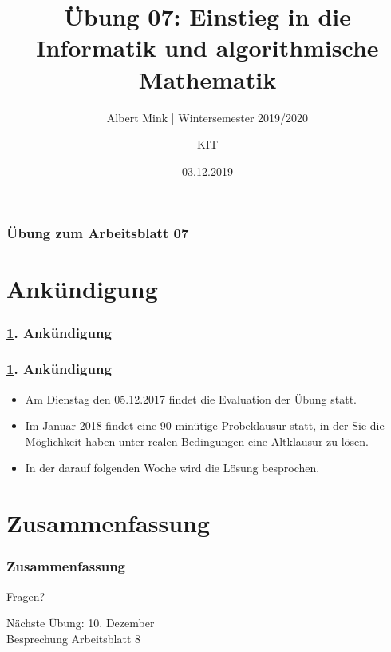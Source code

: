 \documentclass[c,18pt]{beamer}
\date{03.12.2019}
\title[Übung 07: Einstieg in die Informatik und algorithmische Mathematik]
  {Übung 07: Einstieg in die Informatik und algorithmische Mathematik}
\subtitle{Albert Mink | Wintersemester 2019/2020}
\author[Albert Mink, ]{KIT}
\institute[Institut für Angewandte und Numerische Mathematik (IANM)]{Institut für Angewandte und Numerische Mathematik}
\begin{document}
\begin{frame}
  \maketitle
\end{frame}

\begin{frame}
  \frametitle{Übung zum Arbeitsblatt 07}%
\tableofcontents[hideallsubsections]
\end{frame}

\def\kap{0}
\section{Ank\"undigung}\label{K:ank}
\begin{frame}
  \frametitle{\ref{K:ank}. Ank\"undigung}%
\tableofcontents[current]
\end{frame}

\begin{frame}
  \frametitle{\ref{K:ank}. Ank\"undigung}%

\begin{itemize}
\item Am Dienstag den 05.12.2017 findet die Evaluation der \"Ubung statt.
\item Im Januar 2018 findet eine 90 min\"utige Probeklausur statt, in der Sie die M\"oglichkeit haben unter realen Bedingungen eine Altklausur zu l\"osen.
\item In der darauf folgenden Woche wird die L\"osung besprochen.
\end{itemize}

\end{frame}


\def\kap{2}
\setcounter{exercise}{23}
\setcounter{exercise}{24}
\setcounter{exercise}{25}
\setcounter{exercise}{26}

\section{Zusammenfassung}
\begin{frame}
  \frametitle{Zusammenfassung}%
\tableofcontents[hideallsubsections]
\end{frame}

\begin{frame}
\centering
\Huge\textcolor{KITgreen}{Fragen?}
\vspace{2cm}

{\LARGE
N\"achste \"Ubung: 10. Dezember\\
Besprechung Arbeitsblatt 8
}
\end{frame}


\end{document}
